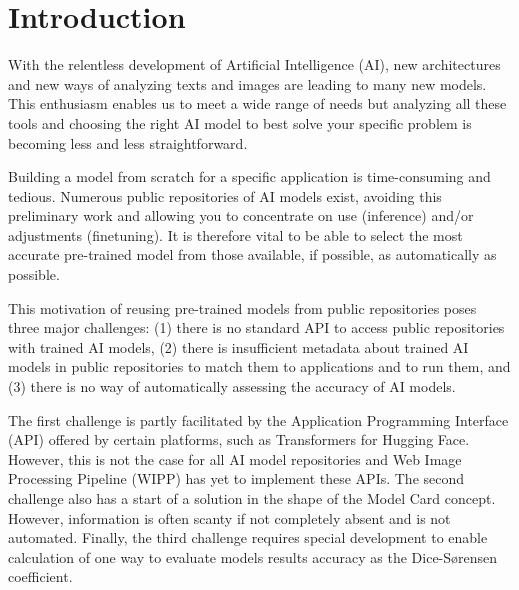 \section{Introduction}
\label{sec:intro}

With the relentless development of Artificial Intelligence (AI), new
architectures and new ways of analyzing texts and images are leading to many new
models. This enthusiasm enables us to meet a wide range of needs but analyzing
all these tools and choosing the right AI model to best solve your specific
problem is becoming less and less straightforward.

Building a model from scratch for a specific application is time-consuming and
tedious. Numerous public repositories of AI models exist, avoiding this
preliminary work and allowing you to concentrate on use (inference) and/or
adjustments (finetuning). It is therefore vital to be able to select the most
accurate pre-trained model from those available, if possible, as automatically
as possible.

This motivation of reusing pre-trained models from public repositories poses
three major challenges: (1) there is no standard API to access public
repositories with trained AI models, (2) there is insufficient metadata about
trained AI models in public repositories to match them to applications and to
run them, and (3) there is no way of automatically assessing the accuracy of AI
models.

The first challenge is partly facilitated by the Application Programming
Interface (API) offered by certain platforms, such as Transformers for Hugging
Face. However, this is not the case for all AI model repositories and Web Image
Processing Pipeline (WIPP) has yet to implement these APIs. The second challenge
also has a start of a solution in the shape of the Model Card concept. However,
information is often scanty if not completely absent and is not automated.
Finally, the third challenge requires special development to enable calculation
of one way to evaluate models results accuracy as the Dice-Sørensen coefficient.

